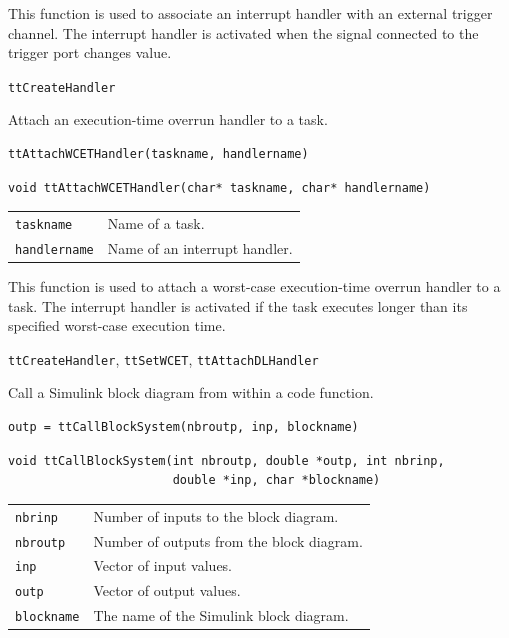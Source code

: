 \documentclass[final,twoside]{rapport}
\begin{document}
\descr This function is used to associate an interrupt handler with an
external trigger channel. The interrupt handler is activated when
the signal connected to the trigger port changes value.

\seealso 
{\tt ttCreateHandler}



\purpose
Attach an execution-time overrun handler to a task.

\Msyntax
\begin{verbatim}
ttAttachWCETHandler(taskname, handlername)
\end{verbatim}

\Csyntax
\begin{verbatim}
void ttAttachWCETHandler(char* taskname, char* handlername)
\end{verbatim}

\args
\begin{tabularx}{\hsize}{l>{\raggedright\arraybackslash}X}
  {\tt taskname} & Name of a task. \\
  {\tt handlername} & Name of an interrupt handler.
\end{tabularx}

\descr This function is used to attach a worst-case execution-time
overrun handler to a task. The interrupt handler is activated if the
task executes longer than its specified worst-case execution time.

\seealso 
{\tt ttCreateHandler}, {\tt ttSetWCET}, {\tt ttAttachDLHandler}



\purpose
Call a Simulink block diagram from within a code function.

\Msyntax
\begin{verbatim}
outp = ttCallBlockSystem(nbroutp, inp, blockname)
\end{verbatim}

\Csyntax
\begin{verbatim}
void ttCallBlockSystem(int nbroutp, double *outp, int nbrinp, 
                       double *inp, char *blockname)
\end{verbatim}

\args
\begin{tabularx}{\hsize}{l>{\raggedright\arraybackslash}X}
  {\tt nbrinp} & Number of inputs to the block diagram. \\
  {\tt nbroutp} & Number of outputs from the block diagram. \\
  {\tt inp} & Vector of input values. \\
  {\tt outp} & Vector of output values. \\
  {\tt blockname} & The name of the Simulink block diagram. 
\end{tabularx}
\end{document}
